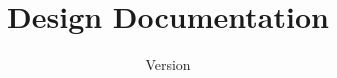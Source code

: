 \documentclass[a4paper, oneside]{scrreprt}
\begin{document}
    \title{Design Documentation}
    \author{\vhListAllAuthors}
    \date{Version \vhCurrentVersion}
    \subject{Ach, ne! - WS2017/18}
    \maketitle

    \begin{versionhistory}
    \end{versionhistory}

    \tableofcontents
    
    
    
\end{document}

